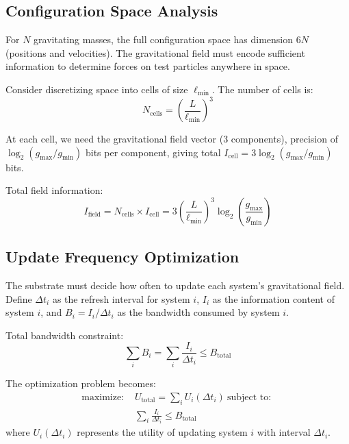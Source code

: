 \documentclass[twocolumn,prd,amsmath,amssymb,aps,superscriptaddress,nofootinbib]{revtex4-2}
\begin{document}
\subsection{Configuration Space Analysis}

For $N$ gravitating masses, the full configuration space has dimension $6N$ (positions and velocities). The gravitational field must encode sufficient information to determine forces on test particles anywhere in space.

Consider discretizing space into cells of size $\ell_{\text{min}}$. The number of cells is:
\begin{equation}
N_{\text{cells}} = \left(\frac{L}{\ell_{\text{min}}}\right)^3
\end{equation}

At each cell, we need the gravitational field vector (3 components), precision of $\log_2(g_{\text{max}}/g_{\text{min}})$ bits per component, giving total $I_{\text{cell}} = 3 \log_2(g_{\text{max}}/g_{\text{min}})$ bits.

Total field information:
\begin{equation}
I_{\text{field}} = N_{\text{cells}} \times I_{\text{cell}} = 3\left(\frac{L}{\ell_{\text{min}}}\right)^3 \log_2\left(\frac{g_{\text{max}}}{g_{\text{min}}}\right)
\end{equation}

\subsection{Update Frequency Optimization}

The substrate must decide how often to update each system's gravitational field. Define $\Delta t_i$ as the refresh interval for system $i$, $I_i$ as the information content of system $i$, and $B_i = I_i/\Delta t_i$ as the bandwidth consumed by system $i$.

Total bandwidth constraint:
\begin{equation}
\sum_i B_i = \sum_i \frac{I_i}{\Delta t_i} \leq B_{\text{total}}
\end{equation}

The optimization problem becomes:
\begin{align}
\text{maximize: } & U_{\text{total}} = \sum_i U_i(\Delta t_i) \
\text{subject to: }\\ & \sum_i \frac{I_i}{\Delta t_i} \leq B_{\text{total}}
\end{align}
where $U_i(\Delta t_i)$ represents the utility of updating system $i$ with interval $\Delta t_i$.
\end{document}
